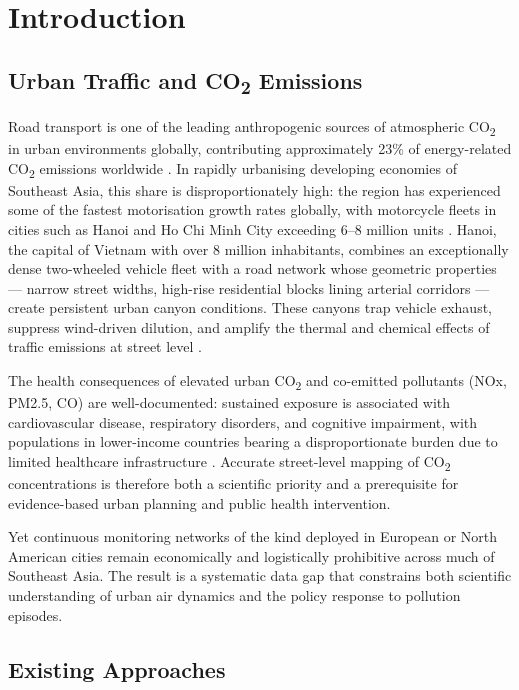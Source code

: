 \documentclass[12pt,a4paper]{article}
\begin{document}
\section{Introduction}

\subsection{Urban Traffic and CO\textsubscript{2} Emissions}

Road transport is one of the leading anthropogenic sources of atmospheric CO\textsubscript{2} in urban environments globally, contributing approximately 23\% of energy-related CO\textsubscript{2} emissions worldwide \cite{IEA2023}. In rapidly urbanising developing economies of Southeast Asia, this share is disproportionately high: the region has experienced some of the fastest motorisation growth rates globally, with motorcycle fleets in cities such as Hanoi and Ho Chi Minh City exceeding 6--8 million units \cite{MoT2022}. Hanoi, the capital of Vietnam with over 8 million inhabitants, combines an exceptionally dense two-wheeled vehicle fleet with a road network whose geometric properties --- narrow street widths, high-rise residential blocks lining arterial corridors --- create persistent urban canyon conditions. These canyons trap vehicle exhaust, suppress wind-driven dilution, and amplify the thermal and chemical effects of traffic emissions at street level \cite{Oke1988,Vardoulakis2003}.

The health consequences of elevated urban CO\textsubscript{2} and co-emitted pollutants (NOx, PM2.5, CO) are well-documented: sustained exposure is associated with cardiovascular disease, respiratory disorders, and cognitive impairment, with populations in lower-income countries bearing a disproportionate burden due to limited healthcare infrastructure \cite{WHO2021}. Accurate street-level mapping of CO\textsubscript{2} concentrations is therefore both a scientific priority and a prerequisite for evidence-based urban planning and public health intervention.

Yet continuous monitoring networks of the kind deployed in European or North American cities remain economically and logistically prohibitive across much of Southeast Asia. The result is a systematic data gap that constrains both scientific understanding of urban air dynamics and the policy response to pollution episodes.

\subsection{Existing Approaches}
\end{document}
